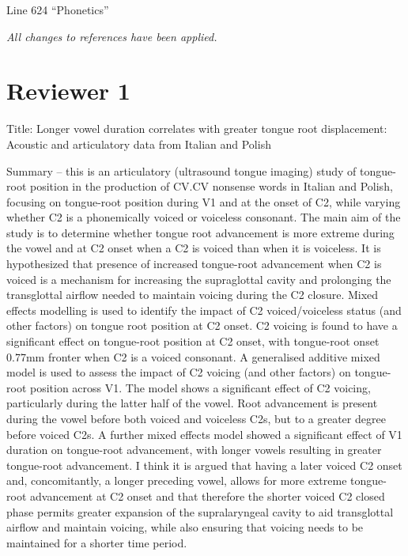 \documentclass[]{article}
\begin{document}
Line 624 ``Phonetics''

\begin{adjustwidth}{1cm}{} \textit{
All changes to references have been applied.
} \end{adjustwidth}

\hypertarget{reviewer-1}{%
\section{Reviewer 1}\label{reviewer-1}}

Title: Longer vowel duration correlates with greater tongue root
displacement: Acoustic and articulatory data from Italian and Polish

Summary -- this is an articulatory (ultrasound tongue imaging) study of
tongue-root position in the production of CV.CV nonsense words in
Italian and Polish, focusing on tongue-root position during V1 and at
the onset of C2, while varying whether C2 is a phonemically voiced or
voiceless consonant. The main aim of the study is to determine whether
tongue root advancement is more extreme during the vowel and at C2 onset
when a C2 is voiced than when it is voiceless. It is hypothesized that
presence of increased tongue-root advancement when C2 is voiced is a
mechanism for increasing the supraglottal cavity and prolonging the
transglottal airflow needed to maintain voicing during the C2 closure.
Mixed effects modelling is used to identify the impact of C2
voiced/voiceless status (and other factors) on tongue root position at
C2 onset. C2 voicing is found to have a significant effect on
tongue-root position at C2 onset, with tongue-root onset 0.77mm fronter
when C2 is a voiced consonant. A generalised additive mixed model is
used to assess the impact of C2 voicing (and other factors) on
tongue-root position across V1. The model shows a significant effect of
C2 voicing, particularly during the latter half of the vowel. Root
advancement is present during the vowel before both voiced and voiceless
C2s, but to a greater degree before voiced C2s. A further mixed effects
model showed a significant effect of V1 duration on tongue-root
advancement, with longer vowels resulting in greater tongue-root
advancement. I think it is argued that having a later voiced C2 onset
and, concomitantly, a longer preceding vowel, allows for more extreme
tongue-root advancement at C2 onset and that therefore the shorter
voiced C2 closed phase permits greater expansion of the supralaryngeal
cavity to aid transglottal airflow and maintain voicing, while also
ensuring that voicing needs to be maintained for a shorter time period.
\end{document}
